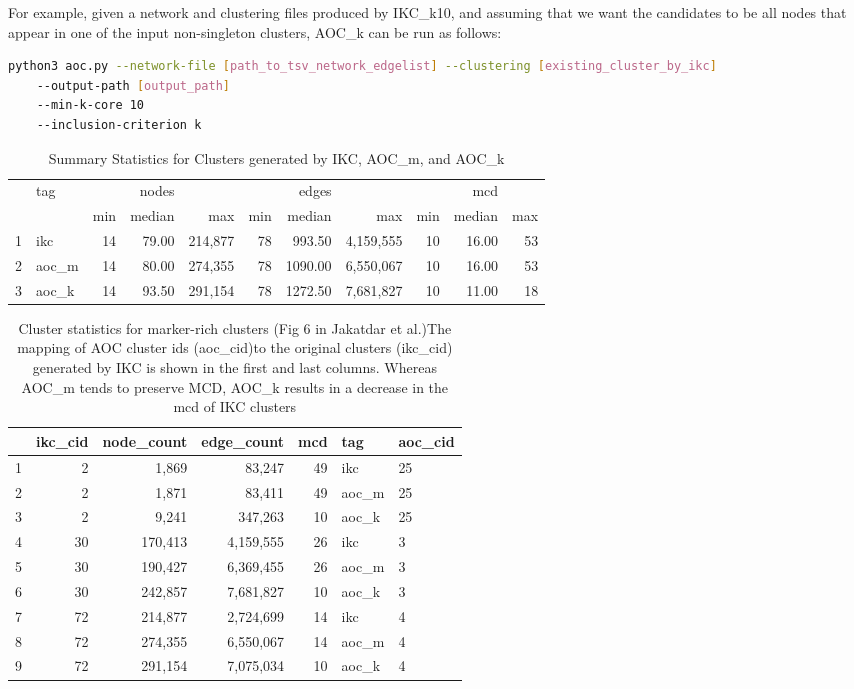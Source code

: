 \documentclass[12pt, oneside]{article}   	%
\begin{document}
For example, given a network and clustering files produced by IKC\_k10, and assuming
that we want the candidates to be all nodes that appear in one of the input non-singleton clusters, AOC\_k can be run as follows:
\begin{lstlisting}[language=bash]
python3 aoc.py --network-file [path_to_tsv_network_edgelist] --clustering [existing_cluster_by_ikc]
    --output-path [output_path]
    --min-k-core 10
    --inclusion-criterion k
\end{lstlisting}

\begin{table}[ht]
\centering
\caption{Summary Statistics for Clusters generated by IKC, AOC\_m, and AOC\_k}
\begin{tabular}{rlrrrrrrrrr}
  \hline
 & tag &  & nodes &  & & edges & &  & mcd &  \\ 
  & & min & median & max & min & median & max & min & median & max   \\ 
  \hline
1 & ikc &  14 & 79.00 & 214,877 &  78 & 993.50 & 4,159,555 &  10 & 16.00 &  53 \\ 
  2 & aoc\_m &  14 & 80.00 & 274,355 &  78 & 1090.00 & 6,550,067 &  10 & 16.00 &  53 \\ 
  3 & aoc\_k &  14 & 93.50 & 291,154 &  78 & 1272.50 & 7,681,827 &  10 & 11.00 &  18 \\ 
   \hline
\end{tabular}
\end{table}

\begin{table}[ht]
\centering
\caption{Cluster statistics for marker-rich clusters (Fig 6 in Jakatdar et al.)The mapping of AOC cluster ids  (aoc\_cid)to the original clusters (ikc\_cid) generated by IKC is shown in the first and last columns. Whereas AOC\_m tends to preserve
MCD, AOC\_k results in a decrease in the mcd of IKC clusters }
\begin{tabular}{rrrrrll}
  \hline
 & ikc\_cid & node\_count & edge\_count & mcd & tag & aoc\_cid \\ 
  \hline
1 &   2 & 1,869 & 83,247 &  49 & ikc & 25\\ 
2 &   2 & 1,871 & 83,411 &  49 & aoc\_m & 25\\ 
3 &   2 & 9,241 & 347,263 &  10 & aoc\_k & 25\\ 
\hline
4 &  30 & 170,413 & 4,159,555 &  26 & ikc & 3\\ 
5 &  30 & 190,427 & 6,369,455 &  26 & aoc\_m & 3 \\ 
6 &  30 & 242,857 & 7,681,827 &  10 & aoc\_k & 3\\ 
\hline
7 &  72 & 214,877 & 2,724,699 &  14 & ikc  & 4\\ 
8 &  72 & 274,355 & 6,550,067 &  14 & aoc\_m & 4 \\ 
9 &  72 & 291,154 & 7,075,034 &  10 & aoc\_k & 4\\ 
   \hline
\end{tabular}
\end{table}
\end{document}
